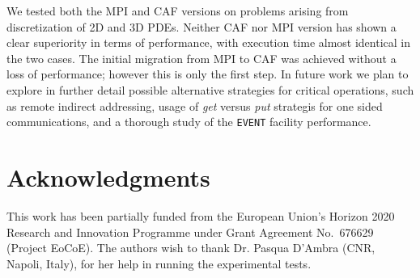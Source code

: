 \documentclass{IOS-Book-Article}
\begin{document}
We tested both the MPI and CAF versions on problems arising from
discretization of 2D and 3D PDEs. Neither CAF nor MPI version has
shown a clear superiority in terms of performance, with execution time
almost identical in the two cases.  The initial migration from MPI to CAF
was achieved without  a loss of performance; however this is only the
first step. In future work we plan to explore in further detail possible
alternative strategies for critical operations, such as  remote
indirect addressing, usage of \emph{get} versus \emph{put} strategis
for one sided communications, and a thorough study of the \verb|EVENT|
facility performance. 

\section{Acknowledgments} 
This work has been partially funded  from the European Union's Horizon 2020 Research
and Innovation Programme under Grant Agreement No.~676629
(Project EoCoE).
The authors wish to thank Dr. Pasqua D'Ambra (CNR, Napoli, Italy),
for her help in running the experimental tests.
 


\end{document}
